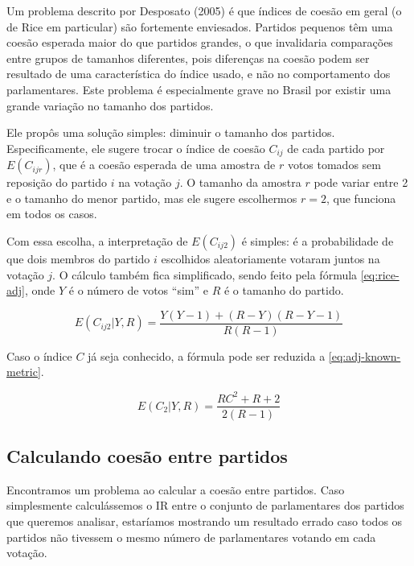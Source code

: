 Um problema descrito por Desposato (2005) é que índices de coesão em geral
(o de Rice em particular) são fortemente enviesados. Partidos pequenos têm uma
coesão esperada maior do que partidos grandes, o que invalidaria comparações
entre grupos de tamanhos diferentes, pois diferenças na coesão podem ser
resultado de uma característica do índice usado, e não no comportamento dos
parlamentares. Este problema é especialmente grave no Brasil por existir uma
grande variação no tamanho dos partidos.\nocite{Desposato2005}

Ele propôs uma solução simples: diminuir o tamanho dos partidos.
Especificamente, ele sugere trocar o índice de coesão $C_{ij}$ de cada
partido por $E(C_{ijr})$, que é a coesão esperada de uma amostra de $r$ votos
tomados sem reposição do partido $i$ na votação $j$. O tamanho da amostra $r$
pode variar entre 2 e o tamanho do menor partido, mas ele sugere escolhermos $r
= 2$, que funciona em todos os casos.\nocite{Desposato2005}

Com essa escolha, a interpretação de $E(C_{ij2})$ é simples: é a probabilidade
de que dois membros do partido $i$ escolhidos aleatoriamente votaram juntos na
votação $j$. O cálculo também fica simplificado, sendo feito pela fórmula
\ref{eq:rice-adj}, onde $Y$ é o número de votos ``sim'' e $R$ é o tamanho do
partido.\nocite{Desposato2005}

\begin{equation}\label{eq:rice-adj}
  E(C_{ij2}|Y, R) = \frac{Y(Y - 1) + (R - Y)(R - Y - 1)}{R(R - 1)}
\end{equation}

Caso o índice $C$ já seja conhecido, a fórmula pode ser reduzida a
\ref{eq:adj-known-metric}.\nocite{Desposato2005}

\begin{equation}\label{eq:adj-known-metric}
  E(C_2|Y, R) = \frac{RC^2 + R + 2}{2(R - 1)}
\end{equation}

\subsection{Calculando coesão entre partidos}

Encontramos um problema ao calcular a coesão entre partidos. Caso simplesmente
calculássemos o \gls{IR} entre o conjunto de parlamentares dos partidos
que queremos analisar, estaríamos mostrando um resultado errado caso todos os
partidos não tivessem o mesmo número de parlamentares votando em cada votação.

